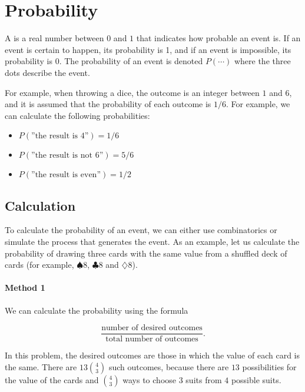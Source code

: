 \chapter{Probability}


A  is a real number between $0$ and $1$
that indicates how probable an event is.
If an event is certain to happen,
its probability is 1,
and if an event is impossible,
its probability is 0.
The probability of an event is denoted $P(\cdots)$
where the three dots describe the event.

For example, when throwing a dice,
the outcome is an integer between $1$ and $6$,
and it is assumed that the probability of
each outcome is $1/6$.
For example, we can calculate the following probabilities:

\begin{itemize}[noitemsep]
\item $P(\textrm{''the result is 4''})=1/6$
\item $P(\textrm{''the result is not 6''})=5/6$
\item $P(\textrm{''the result is even''})=1/2$
\end{itemize}

\section{Calculation}

To calculate the probability of an event,
we can either use combinatorics
or simulate the process that generates the event.
As an example, let us calculate the probability
of drawing three cards with the same value
from a shuffled deck of cards
(for example, $\spadesuit 8$, $\clubsuit 8$ and $\diamondsuit 8$).

\subsubsection*{Method 1}

We can calculate the probability using the formula

\[\frac{\textrm{number of desired outcomes}}{\textrm{total number of outcomes}}.\]

In this problem, the desired outcomes are those
in which the value of each card is the same.
There are $13 {4 \choose 3}$ such outcomes,
because there are $13$ possibilities for the
value of the cards and ${4 \choose 3}$ ways to
choose $3$ suits from $4$ possible suits.

